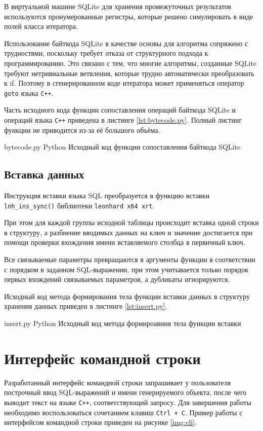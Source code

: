 В виртуальной машине SQLite для хранения промежуточных результатов используются пронумерованные регистры, которые решено симулировать в виде полей класса итератора.

Использование байткода SQLite в качестве основы для алгоритма сопряжено с трудностями, поскольку требует отказа от структурного подхода к программированию.
Это связано с тем, что многие алгоритмы, созданные SQLite требуют нетривиальные ветвления, которые трудно автоматически преобразовать к if.
Поэтому в сгенерированном коде итератора может применяться оператор \texttt{goto} языка \texttt{C++}.

Часть исходного кода функции сопоставления операций байткода SQLite и операций языка \texttt{C++} приведена в листинге \ref{lst:bytecode.py}. Полный листинг функции не приводится из-за её большого объёма.

{bytecode.py}
{Python}
{Исходный код функции сопоставления байткода SQLite}


\subsection{Вставка данных}
Инструкция вставки языка SQL преобразуется в функцию вставки \texttt{lnh\_ins\_sync()} библиотеки \texttt{leonhard x64 xrt}.

При этом для каждой группы исходной таблицы происходит вставка одной строки в структуру, а разбиение вводимых данных на ключ и значение достигается при помощи проверки вхождения имени вставляемого столбца в первичный ключ.

Все связываемые параметры превращаются в аргументы функции в соответствии с порядком в заданном SQL-выражении, при этом учитывается только порядок первых вхождений связываемых параметров, а дубликаты игнорируются.

Исходный код метода формирования тела функции вставки данных в структуру хранения данных приведен в листинге \ref{lst:insert.py}.

{insert.py}
{Python}
{Исходный код метода формироавния тела функции вставки}

\section{Интерфейс командной строки}
Разработанный интерфейс командной строки запрашивает у пользователя построчный ввод SQL-выражений и имени генерируемого объекта, после чего выводит текст на языке \texttt{C++}, соответствующий запросу.
Для завершения работы необходимо воспользоваться сочетанием клавиш \texttt{Ctrl + C}.
Пример работы с интерфейсом командной строки приведен на рисунке \ref{img:cli}.

